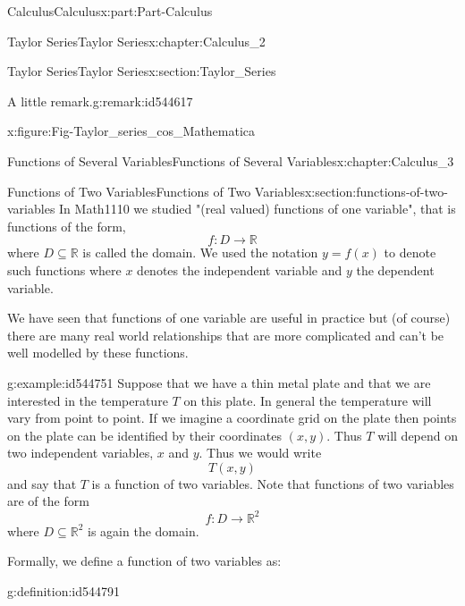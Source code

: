 \documentclass[oneside,10pt,]{book}
\numberwithin{equation}{section}
\begin{document}
\begin{partptx}{Calculus}{}{Calculus}{}{}{x:part:Part-Calculus}
\begin{chapterptx}{Taylor Series}{}{Taylor Series}{}{}{x:chapter:Calculus_2}
\begin{sectionptx}{Taylor Series}{}{Taylor Series}{}{}{x:section:Taylor_Series}
\begin{remark}{A little remark.}{g:remark:id544617}
\begin{figureptx}{}{x:figure:Fig-Taylor_series_cos_Mathematica}{}
\begin{image}{0.05}{0.9}{0.05}
\end{image}%
\tcblower
\end{figureptx}%
\end{remark}
\end{sectionptx}
\end{chapterptx}
%
\typeout{************************************************}
\typeout{************************************************}
%
\begin{chapterptx}{Functions of Several Variables}{}{Functions of Several Variables}{}{}{x:chapter:Calculus_3}
%
%
\typeout{************************************************}
\typeout{************************************************}
%
\begin{sectionptx}{Functions of Two Variables}{}{Functions of Two Variables}{}{}{x:section:functions-of-two-variables}
In Math1110 we studied "(real valued) functions of one variable", that is functions of the form,%
\begin{equation*}
f:D\rightarrow\mathbb{R}
\end{equation*}
where \(D\subseteq\mathbb{R}\) is called the domain. We used the notation \(y=f(x)\)  to denote such functions where \(x\) denotes the independent variable and \(y\) the dependent variable.%
\par
We have seen that functions of one variable are useful in practice but (of course) there are many real world relationships that are more complicated and can't be well modelled by these functions.%
\begin{example}{}{g:example:id544751}%
Suppose that we have a thin metal plate and that we are interested in the temperature \(T\) on this plate. In general the temperature will vary from point to point. If we imagine a coordinate grid on the plate then points on the plate can be identified by their coordinates \((x,y)\). Thus \(T\) will depend on two independent variables, \(x\) and \(y\). Thus we would write%
\begin{equation*}
T(x,y)
\end{equation*}
and say that \(T\) is a function of two variables. Note that functions of two variables are of the form%
\begin{equation*}
f:D\rightarrow\mathbb{R}^2
\end{equation*}
where \(D\subseteq\mathbb{R}^2\) is again the domain.%
\end{example}
Formally, we define a function of two variables as: \begin{definition}{}{g:definition:id544791}%

\end{definition}
\end{sectionptx}
\end{chapterptx}
\end{partptx}
\end{document}
